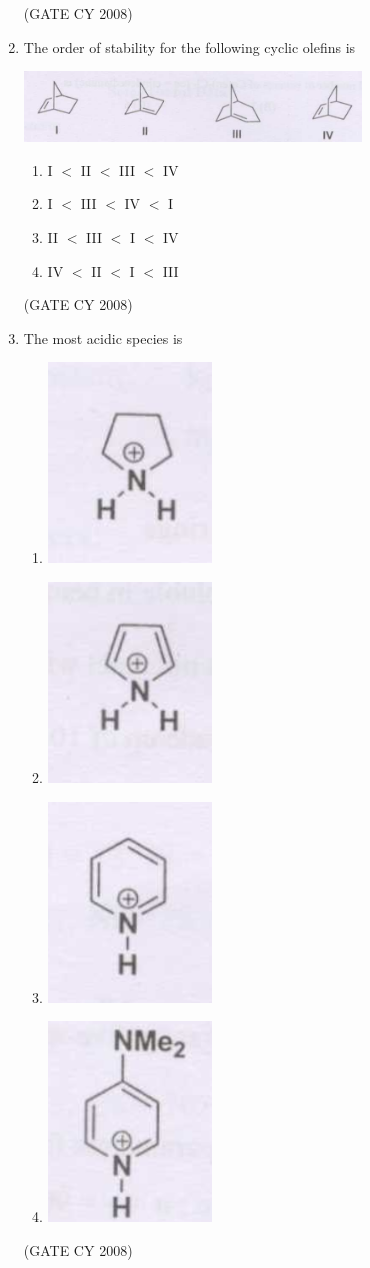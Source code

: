 \documentclass[12pt]{article}
\begin{document}
\begin{enumerate}
\bigskip
    \hfill{(GATE CY 2008)}


\item The order of stability for the following cyclic olefins is

\begin{center}
  \includegraphics[width=0.7\columnwidth]{figs/q8.png} 
\end{center}

\begin{enumerate}
  \item I \(<\) II \(<\) III \(<\) IV
  \item I \(<\) III \(<\) IV \(<\) I
  \item II \(<\) III \(<\) I \(<\) IV
  \item IV \(<\) II \(<\) I \(<\) III
\end{enumerate}    \hfill{(GATE CY 2008)}


\item The most acidic species is

\begin{enumerate}
    \item \includegraphics[width=0.1\columnwidth]{figs/q9 a.png} 
    \item \includegraphics[width=0.1\columnwidth]{figs/q9 b.png} 
    \item \includegraphics[width=0.1\columnwidth]{figs/q9 c.png} 
    \item \includegraphics[width=0.1\columnwidth]{figs/q9 d.png} 
\end{enumerate}
   \hfill{(GATE CY 2008)}





\end{enumerate}
\end{document}
